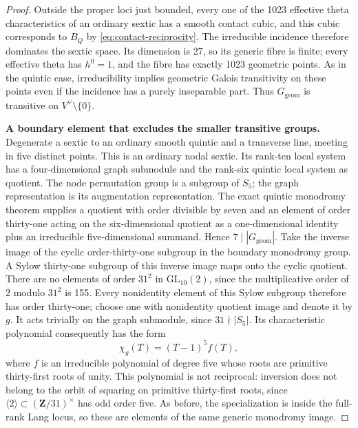 \begin{proof}
Outside the proper loci just bounded, every one of the 1023 effective
theta characteristics of an ordinary sextic has a smooth contact
cubic, and this cubic corresponds to $B_Q$ by
\eqref{eq:contact-reciprocity}.  The irreducible incidence therefore
dominates the sextic space.  Its dimension is 27, so its generic
fibre is finite; every effective theta has $h^0=1$, and the fibre has
exactly 1023 geometric points.  As in the quintic case, irreducibility
implies geometric Galois transitivity on these points even if the
incidence has a purely inseparable part.  Thus $G_{\mathrm{geom}}$
is transitive on $V^\vee\setminus\{0\}$.

\par\smallskip\noindent\textbf{A boundary element that excludes the smaller transitive groups.}
Degenerate a sextic to an ordinary smooth quintic and a transverse
line, meeting in five distinct points.  This is an ordinary nodal
sextic.  Its rank-ten local system has a four-dimensional graph
submodule and the rank-six quintic local system as quotient.
The node permutation group is a subgroup of $S_5$; the graph
representation is its augmentation representation.
The exact quintic monodromy theorem supplies a quotient with order
divisible by seven and an element of order thirty-one acting on the
six-dimensional quotient as a one-dimensional identity plus an
irreducible five-dimensional summand.  Hence $7\mid|G_{\mathrm{geom}}|$.
Take the inverse image of the cyclic order-thirty-one subgroup in
the boundary monodromy group.  A Sylow thirty-one subgroup of this
inverse image maps onto the cyclic quotient.  There are no elements
of order $31^2$ in $\mathrm{GL}_{10}(2)$, since the multiplicative
order of $2$ modulo $31^2$ is 155.  Every nonidentity element of this
Sylow subgroup therefore has order thirty-one; choose one with
nonidentity quotient image and denote it by $g$.
It acts trivially on the graph submodule, since $31\nmid|S_5|$.
Its characteristic polynomial consequently has the form
\begin{equation}\label{eq:sextic-order31}
 \chi_g(T)=(T-1)^5 f(T),
\end{equation}
where $f$ is an irreducible polynomial of degree five whose roots
are primitive thirty-first roots of unity.
This polynomial is not reciprocal: inversion does not belong to
the orbit of squaring on primitive thirty-first roots, since
$\langle2\rangle\subset(\mathbf Z/31)^\times$ has odd order five.
As before, the specialization is inside the full-rank Lang locus,
so these are elements of the same generic monodromy image.


\end{proof}
